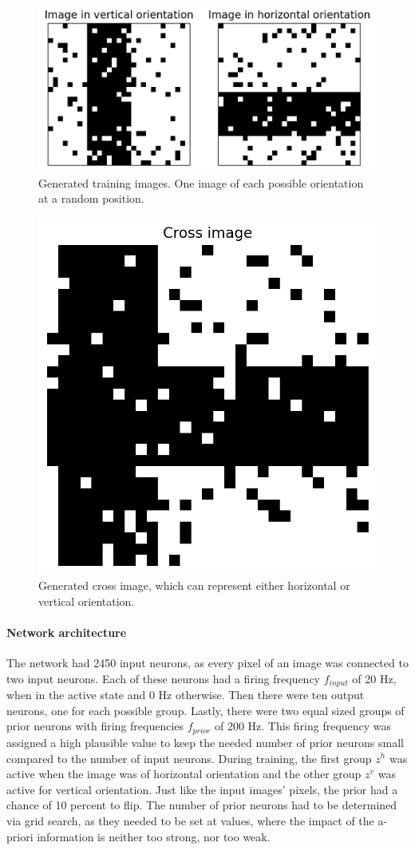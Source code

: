 \begin{figure}
  \includegraphics[width=\linewidth]{figures/horvert/horvertTrainingImages.png}
  \caption{Generated training images. One image of each possible orientation at a random position.}
  \label{fig:horvertImages}
\end{figure}

\begin{figure}
\centering
  \includegraphics[width=0.45\linewidth]{figures/horvert/horvertTrainingCrossImage.png}
  \caption{Generated cross image, which can represent either horizontal or vertical orientation.}
  \label{fig:horvertTrainingCrossImage}
\end{figure}

\paragraph{Network architecture}

The network had 2450 input neurons, as every pixel of an image was connected to two input neurons. Each of these neurons had a firing frequency $f_{input}$ of 20 Hz, when in the active state and 0 Hz otherwise. Then there were ten output neurons, one for each possible group. Lastly, there were two equal sized groups of prior neurons with firing frequencies $f_{prior}$ of 200 Hz. This firing frequency was assigned a high plausible value to keep the needed number of prior neurons small compared to the number of input neurons. During training, the first group $z^h$ was active when the image was of horizontal orientation and the other group $z^v$ was active for vertical orientation. Just like the input images' pixels, the prior had a chance of 10 percent to flip. The number of prior neurons had to be determined via grid search, as they needed to be set at values, where the impact of the a-priori information is neither too strong, nor too weak.

